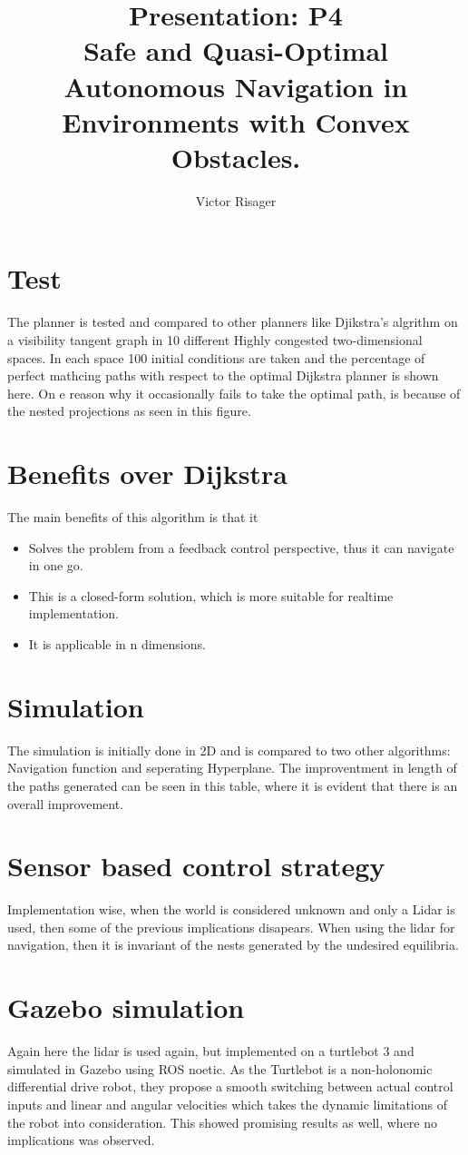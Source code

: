 \documentclass[a4paper]{article}
\title{Presentation: P4  \\
	\large Safe and Quasi-Optimal Autonomous Navigation in Environments with Convex Obstacles.}
\author{Victor Risager}
\begin{document}
\maketitle


\section{Test}
The planner is tested and compared to other planners like Djikstra's algrithm on a visibility tangent graph in 10 different Highly congested two-dimensional spaces. In each space 100 initial conditions are taken and the percentage of perfect mathcing paths with respect to the optimal Dijkstra planner is shown here. On e reason why it occasionally fails to take the optimal path, is because of the nested projections as seen in this figure.


\section{Benefits over Dijkstra}
The main benefits of this algorithm is that it
\begin{itemize}
	\item Solves the problem from a feedback control perspective, thus it can navigate in one go. 
	\item This is a closed-form solution, which is more suitable for realtime implementation.
	\item It is applicable in n dimensions. 
\end{itemize}


\section{Simulation}
The simulation is initially done in 2D and is compared to two other algorithms: Navigation function and seperating Hyperplane. The improventment in length of the paths generated can be seen in this table, where it is evident that there is an overall improvement. 

\section{Sensor based control strategy}
Implementation wise, when the world is considered unknown and only a Lidar is used, then some of the previous implications disapears. When using the lidar for navigation, then it is invariant of the nests generated by the undesired equilibria. 

\section{Gazebo simulation}
Again here the lidar is used again, but implemented on a turtlebot 3 and simulated in Gazebo using ROS noetic. As the Turtlebot is a non-holonomic differential drive robot, they propose a smooth switching between actual control inputs and linear and angular velocities which takes the dynamic limitations of the robot into consideration. This showed promising results as well, where no implications was observed. 
\end{document}
